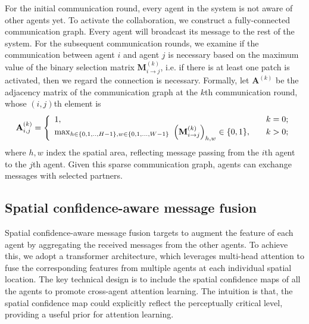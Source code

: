For the initial communication round, every agent in the system is not aware of other agents yet. To activate the collaboration, we construct a fully-connected communication graph. Every agent will broadcast its message to the rest of the system. For the subsequent communication rounds, we examine if the communication between agent $i$ and agent $j$ is necessary based on the maximum value of the binary selection matrix $\mathbf{M}_{i\rightarrow j}^{(k)}$, i.e. if there is at least one patch is activated, then we regard the connection is necessary. Formally, let $\mathbf{A}^{(k)}$ be the adjacency matrix of the communication graph at the $k$th communication round, whose $(i,j)$th element is \vspace{-1mm}
\begin{equation*}
 \mathbf{A}_{i,j}^{(k)}=\left\{
\begin{array}{lll}
1, &\quad k=0; \\
{\rm max}_{h \in \{0,1,..,H-1\},w \in \{0,1,...,W-1\}}~ \left( \mathbf{M}_{i\rightarrow j}^{(k)} \right)_{h,w} \in \{0, 1\}, &\quad k>0;
\end{array} \right.
\end{equation*}
where $h, w$ index the spatial area, reflecting message passing from the $i$th agent to the $j$th agent.  Given this sparse communication graph, agents can exchange messages with selected partners.


\vspace{-2mm}
\subsection{Spatial confidence-aware message fusion}
\label{sec:Fusion}
\vspace{-2mm}
Spatial confidence-aware message fusion targets to augment the feature of each agent by aggregating the received messages from the other agents. To achieve this, we adopt a transformer architecture, which leverages multi-head attention to fuse the corresponding features from multiple agents at each individual spatial location. The key technical design is to include the spatial confidence maps of all the agents to promote cross-agent attention learning. The intuition is that, the spatial confidence map could explicitly reflect the perceptually critical level, providing a useful prior for attention learning.

